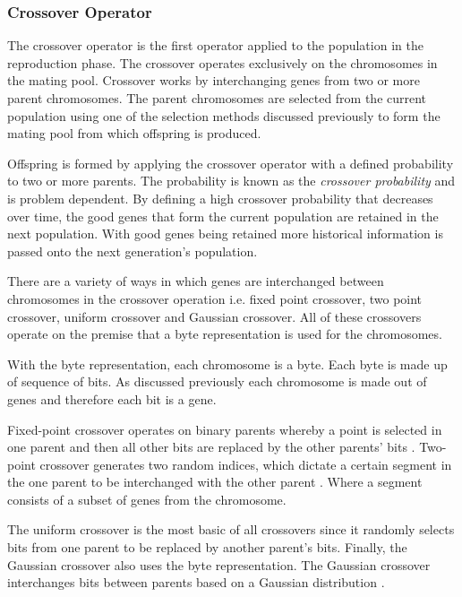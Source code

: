 \subsubsection{Crossover Operator}
\label{sec:crossover}
The crossover operator is the first operator applied to the population in the reproduction phase. The crossover operates exclusively on the chromosomes in the mating pool. Crossover works by interchanging genes from two or more parent chromosomes. The parent chromosomes are selected from the current population using one of the selection methods discussed previously to form the mating pool from which offspring is produced\cite{FamilyGA,HumanPassiveGA,CoactiveFuzzyGA}. 

Offspring is formed by applying the crossover operator with a defined probability to two or more parents. The probability is known as the \emph{crossover probability} and is problem dependent\cite{CompuIntelligenceIntro}. By defining a high crossover probability that decreases over time, the good genes that form the current population are retained in the next population\cite{CompuIntelligenceIntro}. With good genes being retained more historical information is passed onto the next generation's population\cite{FamilyGA}.

There are a variety of ways in which genes are interchanged between chromosomes in the crossover operation i.e. fixed point crossover, two point crossover, uniform crossover and Gaussian crossover\cite{CompuIntelligenceIntro}. All of these crossovers operate on the premise that a byte representation is used for the chromosomes. 

With the byte representation, each chromosome is a byte. Each byte is made up of sequence of bits. As discussed previously each chromosome is made out of genes and therefore each bit is a gene\cite{CompuIntelligenceIntro}.

Fixed-point crossover operates on binary parents whereby a point is selected in one parent and then all other bits are replaced by the other parents' bits \cite{HumanPassiveGA}. Two-point crossover generates two random indices, which dictate a certain segment in the one parent to be interchanged with the other parent \cite{ConstrainedGA}. Where a segment consists of a subset of genes from the chromosome. 

The uniform crossover is the most basic of all crossovers since it randomly selects bits from one parent to be replaced by another parent's bits\cite{ParallelGASA,GeostatisticalGA}. Finally, the Gaussian crossover also uses the byte representation. The Gaussian crossover interchanges bits between parents based on a Gaussian distribution \cite{ParallelGASA,GeostatisticalGA}.

